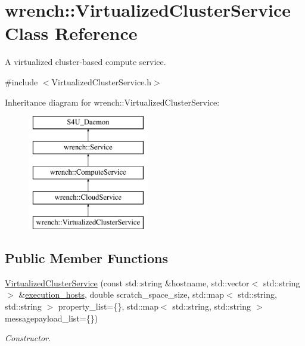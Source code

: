 \hypertarget{classwrench_1_1_virtualized_cluster_service}{}\section{wrench\+:\+:Virtualized\+Cluster\+Service Class Reference}
\label{classwrench_1_1_virtualized_cluster_service}


A virtualized cluster-\/based compute service.  




{\ttfamily \#include $<$Virtualized\+Cluster\+Service.\+h$>$}

Inheritance diagram for wrench\+:\+:Virtualized\+Cluster\+Service\+:\begin{figure}[H]
\begin{center}
\leavevmode
\includegraphics[height=5.000000cm]{classwrench_1_1_virtualized_cluster_service}
\end{center}
\end{figure}
\subsection*{Public Member Functions}
\begin{DoxyCompactItemize}
\item 
\hyperlink{classwrench_1_1_virtualized_cluster_service_a7be5224d65410f4570ce9f9e9c835bd5}{Virtualized\+Cluster\+Service} (const std\+::string \&hostname, std\+::vector$<$ std\+::string $>$ \&\hyperlink{classwrench_1_1_cloud_service_a8225cae457e491f3f3aad32653910ea0}{execution\+\_\+hosts}, double scratch\+\_\+space\+\_\+size, std\+::map$<$ std\+::string, std\+::string $>$ property\+\_\+list=\{\}, std\+::map$<$ std\+::string, std\+::string $>$ messagepayload\+\_\+list=\{\})
\begin{DoxyCompactList}\small\item\em Constructor. \end{DoxyCompactList}\end{DoxyCompactItemize}
